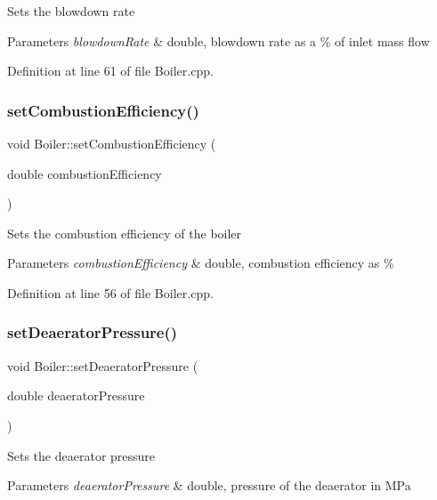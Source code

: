 Sets the blowdown rate 
\begin{DoxyParams}{Parameters}
{\em blowdown\+Rate} & double, blowdown rate as a \% of inlet mass flow \\
\hline
\end{DoxyParams}


Definition at line 61 of file Boiler.\+cpp.

\mbox{\label{class_boiler_abef6bc48101f98f0650cb07fb1d51f74}} 
\subsubsection{\texorpdfstring{set\+Combustion\+Efficiency()}{setCombustionEfficiency()}}
{\footnotesize\ttfamily void Boiler\+::set\+Combustion\+Efficiency (\begin{DoxyParamCaption}\item[{double}]{combustion\+Efficiency }\end{DoxyParamCaption})}

Sets the combustion efficiency of the boiler 
\begin{DoxyParams}{Parameters}
{\em combustion\+Efficiency} & double, combustion efficiency as \% \\
\hline
\end{DoxyParams}


Definition at line 56 of file Boiler.\+cpp.

\mbox{\label{class_boiler_a56f422254606ebba1248ae0b4f8f0215}} 
\subsubsection{\texorpdfstring{set\+Deaerator\+Pressure()}{setDeaeratorPressure()}}
{\footnotesize\ttfamily void Boiler\+::set\+Deaerator\+Pressure (\begin{DoxyParamCaption}\item[{double}]{deaerator\+Pressure }\end{DoxyParamCaption})}

Sets the deaerator pressure 
\begin{DoxyParams}{Parameters}
{\em deaerator\+Pressure} & double, pressure of the deaerator in M\+Pa \\
\hline
\end{DoxyParams}


